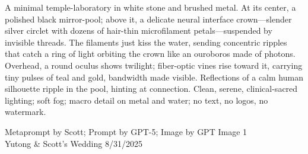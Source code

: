 \documentclass[12pt]{article}
\begin{document}
\noindent
\begin{adjustbox}{max size={\textwidth}{\textheight}}
\begin{varwidth}{\textwidth}
\RaggedRight
\footnotesize
A minimal temple-laboratory in white stone and brushed metal. At its center, a polished black mirror-pool; above it, a delicate neural interface crown—slender silver circlet with dozens of hair-thin microfilament petals—suspended by invisible threads. The filaments just kiss the water, sending concentric ripples that catch a ring of light orbiting the crown like an ouroboros made of photons. Overhead, a round oculus shows twilight; fiber-optic vines rise toward it, carrying tiny pulses of teal and gold, bandwidth made visible. Reflections of a calm human silhouette ripple in the pool, hinting at connection. Clean, serene, clinical-sacred lighting; soft fog; macro detail on metal and water; no text, no logos, no watermark.
\end{varwidth}
\end{adjustbox}
\vfill
{\raggedleft\footnotesize
Metaprompt by Scott; Prompt by GPT-5; Image by GPT Image 1 \\
Yutong \& Scott's Wedding 8/31/2025\par}
\end{document}
